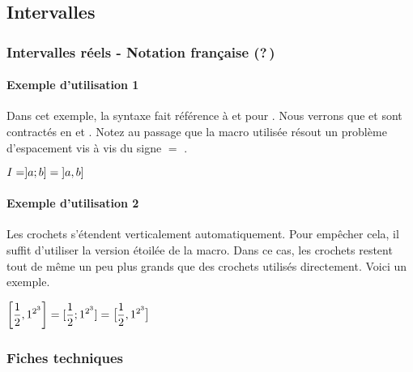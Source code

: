 \documentclass[12pt,a4paper]{article}
\begin{document}

\subsection{Intervalles}

\subsubsection{Intervalles réels - Notation française (?\,)}

\paragraph{Exemple d'utilisation 1}

Dans cet exemple, la syntaxe fait référence à 
 et 
pour
.
Nous verrons que  et  sont contractés en  et .
Notez au passage que la macro utilisée résout un problème d'espacement vis à vis du signe $=$ .

\begin{latexex}
$I = ]a ; b] = \intervalOC{a}{b}$
\end{latexex}




\paragraph{Exemple d'utilisation 2}

Les crochets s'étendent verticalement automatiquement. Pour empêcher cela, il suffit d'utiliser la version étoilée de la macro.
Dans ce cas, les crochets restent tout de même un peu plus grands que des crochets utilisés directement. Voici un exemple.

\begin{latexex}
$\displaystyle
 \intervalC{ \frac{1}{2} }{ 1^{2^{3}} }
 =
 [ \frac{1}{2} ; 1^{2^{3}} ]
 =
 \intervalC*{ \frac{1}{2} }{ 1^{2^{3}} }$
\end{latexex}




\subsubsection{Fiches techniques}
\end{document}
